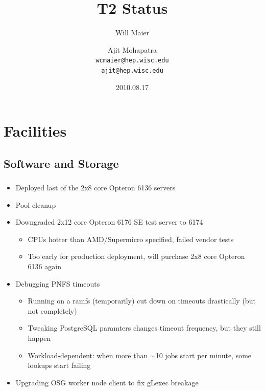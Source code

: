 \documentclass{beamer}
\title{T2 Status}
\author[Maier, Mohapatra]{
    Will Maier \and Ajit Mohapatra\\
    {\tt wcmaier@hep.wisc.edu}\\
    {\tt ajit@hep.wisc.edu}}
\institute[Wisconsin]{University of Wisconsin - High Energy Physics}
\date{2010.08.17}
\newcommand{\ca}{\ensuremath{\sim}}
\begin{document}
\begin{frame}
    \titlepage
\end{frame}


\section{Facilities}
\subsection{Software and Storage}
\begin{frame}
\frametitle{}

\begin{itemize}
  \item Deployed last of the 2x8 core Opteron 6136 servers
  \item Pool cleanup
  \item Downgraded 2x12 core Opteron 6176 SE test server to 6174
  \begin{itemize}
    \item CPUs hotter than AMD/Supermicro specified, failed vendor tests
    \item Too early for production deployment, will purchase 2x8 core Opteron 6136 again
  \end{itemize}
  \item Debugging PNFS timeouts
  \begin{itemize}
    \item Running on a ramfs (temporarily) cut down on timeouts drastically (but not completely)
    \item Tweaking PostgreSQL paramters changes timeout frequency, but they still happen
    \item Workload-dependent: when more than \ca{}10 jobs start per minute, some lookups start failing
  \end{itemize}
  \item Upgrading OSG worker node client to fix gLexec breakage
\end{itemize}
\end{frame}
\end{document}
